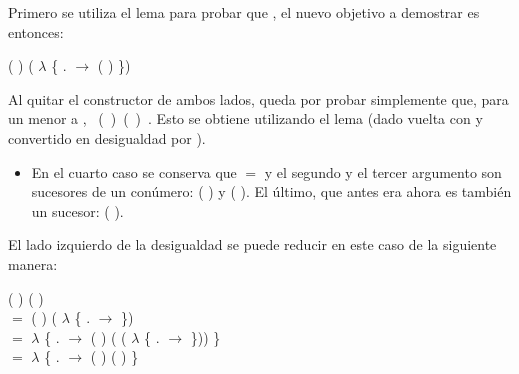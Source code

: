 \begin{AgdaAlign}
Primero se utiliza el lema  para probar que \AgdaFunction{[}  \AgdaFunction{]}   \AgdaFunction{$\leq$}  , el nuevo objetivo a demostrar es entonces:
\begin{center}
\AgdaFunction{[}  \AgdaFunction{]}  ( ) \AgdaFunction{$\leq$} ( $\lambda$ \{ . $\rightarrow$  ( )  \})
\end{center}

Al quitar el constructor  de ambos lados, queda por probar simplemente que, para un  menor a , \hbox{\AgdaFunction{[}  \AgdaFunction{]} ( ) \AgdaFunction{$\leq$}  ( ) }. Esto se obtiene utilizando el lema  (dado vuelta con  y convertido en desigualdad por \AgdaFunction{$\sim\rightarrow\leq$}).

\begin{itemize}
\item En el cuarto caso se conserva que  $=$  y el segundo y el tercer argumento son sucesores de un conúmero: ( ) y  ( ). El último, que antes era  ahora es también un sucesor: ( ).
\end{itemize}

El lado izquierdo de la desigualdad se puede reducir en este caso de la siguiente manera: 

 ( \AgdaFunction{+}  ) (  \AgdaFunction{+}  ) \\
$=$  ( ) ( $\lambda$ \{ . $\rightarrow$   \AgdaFunction{+}   \}) \\
$=$  $\lambda$ \{ . $\rightarrow$  ( ) ( ( $\lambda$ \{ . $\rightarrow$   \AgdaFunction{+}   \})) \} \\
$=$  $\lambda$ \{ . $\rightarrow$  ( ) (  \AgdaFunction{+}  ) \} 


\end{AgdaAlign}
